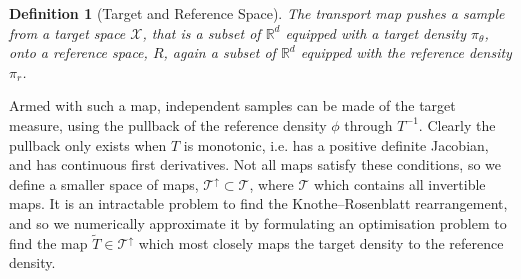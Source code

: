 \documentclass[final]{siamltex}
\newcommand{\edit}[1]{#1}
\newtheorem{dfn}{Definition}[section]
\begin{document}
\begin{dfn}[Target and Reference Space]
	The transport map pushes a sample from a {\it target space} $\mathcal{X}$, that is a subset of $\mathbb{R}^d$ equipped with a target density $\pi_{\theta}$, onto a {\it reference space}, $R$, again a subset of $\mathbb{R}^d$ equipped with the reference density $\pi_r$.
\end{dfn}

Armed with such a map, independent samples can be made of the target
measure, using the pullback of the reference density $\phi$ through $T^{-1}$.
Clearly the pullback only exists when $T$ is monotonic, i.e. has a positive definite Jacobian, and has continuous first derivatives.
Not all maps satisfy these conditions, so we define a smaller space of
maps, $\mathcal{T}^\uparrow \subset \mathcal{T}$, \edit{ where $\mathcal{T}$ which contains all
invertible maps. It is an intractable problem to find the
  Knothe–Rosenblatt rearrangement, and so we numerically approximate
  it by formulating an optimisation problem to find the map $\tilde{T}
\in \mathcal{T}^\uparrow$ which most closely maps the target density
to the reference density.}

\end{document}
